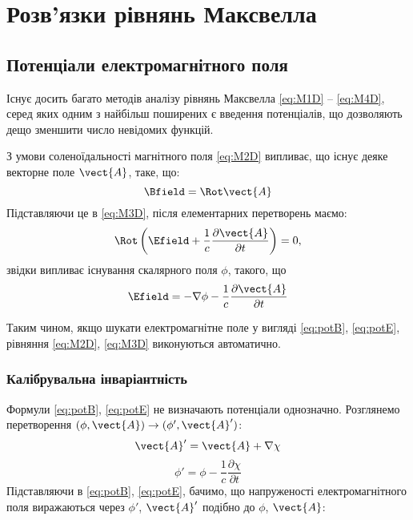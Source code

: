 
\chapter{Розв’язки рівнянь Максвелла}\label{\currfilebase}

\section{Потенціали електромагнітного поля}

Існує досить багато методів аналізу рівнянь Максвелла \eqref{eq:M1D} -- \eqref{eq:M4D}, серед яких одним з найбільш поширених є введення потенціалів, що
дозволяють дещо
зменшити число невідомих функцій.

З умови соленоїдальності магнітного поля \eqref{eq:M2D} випливає, що існує деяке векторне поле $\vect{A}$, таке, що:
\begin{equation}\label{eq:potB}
	 \Bfield = \Rot\vect{A}
\end{equation}
Підставляючи це в \eqref{eq:M3D}, після елементарних перетворень маємо:
\begin{equation*}
	\Rot \left( \Efield + \frac{1}{c} \frac{\partial \vect{A}}{\partial t}\right)  = 0,
\end{equation*}
звідки випливає існування скалярного поля $\phi$, такого, що
\begin{equation}\label{eq:potE}
	\Efield = -\nabla \phi - \frac{1}{c} \frac{\partial \vect{A}}{\partial t}
\end{equation}

Таким чином, якщо шукати електромагнітне поле у вигляді \eqref{eq:potB}, \eqref{eq:potE}, рівняння \eqref{eq:M2D}, \eqref{eq:M3D} виконуються
автоматично.

\subsection*{Калібрувальна інваріантність}

Формули \eqref{eq:potB}, \eqref{eq:potE} не визначають потенціали однозначно. Розглянемо перетворення $(\phi, \vect{A}) \to (\phi', \vect{A}')$:
\begin{equation}\label{eq:A'}
	\vect{A}' = \vect{A} + \nabla \chi
\end{equation}
\begin{equation}\label{eq:phi'}
	\phi' = \phi - \frac{1}{c} \frac{\partial \chi}{\partial t}
\end{equation}
Підставляючи в \eqref{eq:potB}, \eqref{eq:potE}, бачимо, що напруженості електромагнітного
поля виражаються через $\phi'$, $\vect{A}'$ подібно до $\phi$, $\vect{A}$:

